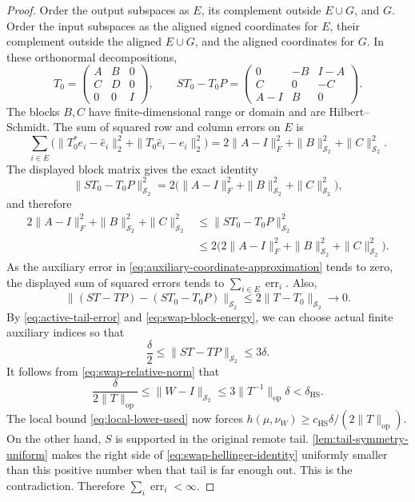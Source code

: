 \begin{proof}
Order the output subspaces as $E$, its complement outside $E\cup G$, and $G$.
Order the input subspaces as the aligned signed coordinates for $E$, their
complement outside the aligned $E\cup G$, and the aligned coordinates for
$G$.
In these orthonormal decompositions,
\[
 T_0=\begin{pmatrix}A&B&0\\ C&D&0\\0&0&I\end{pmatrix},
 \qquad
 ST_0-T_0P=
 \begin{pmatrix}
 0&-B&I-A\\
 C&0&-C\\
 A-I&B&0
 \end{pmatrix}.
\]
The blocks $B,C$ have finite-dimensional range or domain and are
Hilbert--Schmidt.  The sum of squared row and column errors on $E$ is
\[
 \sum_{i\in E}
 \bigl(\|T_0^*e_i-\widehat e_i\|_2^2
                    +\|T_0\widehat e_i-e_i\|_2^2\bigr)
 =2\|A-I\|_F^2+\|B\|_{\mathcal S_2}^2+\|C\|_{\mathcal S_2}^2.
\]
The displayed block matrix gives the exact identity
\[
 \|ST_0-T_0P\|_{\mathcal S_2}^2
 =2\bigl(\|A-I\|_F^2+\|B\|_{\mathcal S_2}^2
                         +\|C\|_{\mathcal S_2}^2\bigr),
\]
and therefore
\begin{equation}
 \begin{aligned}
 2\|A-I\|_F^2+\|B\|_{\mathcal S_2}^2+\|C\|_{\mathcal S_2}^2
 &\leq\|ST_0-T_0P\|_{\mathcal S_2}^2\\
 &\leq2\bigl(2\|A-I\|_F^2+\|B\|_{\mathcal S_2}^2
                              +\|C\|_{\mathcal S_2}^2\bigr).
 \end{aligned}
 \label{eq:swap-block-energy}
\end{equation}
As the auxiliary error in
\eqref{eq:auxiliary-coordinate-approximation} tends to zero,
the displayed sum of squared errors tends to
$\sum_{i\in E}\operatorname{err}_i$.
Also,
\[
 \|(ST-TP)-(ST_0-T_0P)\|_{\mathcal S_2}
 \leq2\|T-T_0\|_{\mathcal S_2}\longrightarrow0.
\]
By \eqref{eq:active-tail-error} and
\eqref{eq:swap-block-energy}, we can choose actual finite auxiliary indices
so that
\[
 \frac{\delta}{2}\leq\|ST-TP\|_{\mathcal S_2}\leq3\delta.
\]
It follows from \eqref{eq:swap-relative-norm} that
\[
 \frac{\delta}{2\|T\|_{\mathrm{op}}}
 \leq\|W-I\|_{\mathcal S_2}
 \leq3\|T^{-1}\|_{\mathrm{op}}\delta<\delta_{\mathrm{HS}}.
\]
The local bound \eqref{eq:local-lower-used} now forces
$h(\mu,\nu_W)\geq c_{\mathrm{HS}}\delta/(2\|T\|_{\mathrm{op}})$.
On the other hand, $S$ is supported in the original remote tail.
\cref{lem:tail-symmetry-uniform} makes the right side of
\eqref{eq:swap-hellinger-identity} uniformly smaller than this positive
number when that tail is far enough out.
This is the contradiction.
Therefore $\sum_i\operatorname{err}_i<\infty$.


\end{proof}
